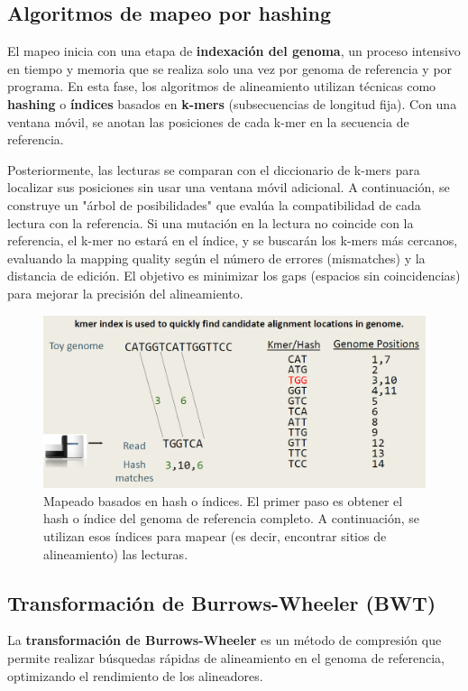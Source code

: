 \begin{itemize}
\subsection{Algoritmos de mapeo por hashing}
El mapeo inicia con una etapa de \textbf{indexación del genoma}, un proceso intensivo en tiempo y memoria que se realiza solo una vez por genoma de referencia y por programa. En esta fase, los algoritmos de alineamiento utilizan técnicas como \textbf{hashing} o \textbf{índices} basados en \textbf{k-mers} (subsecuencias de longitud fija). Con una ventana móvil, se anotan las posiciones de cada k-mer en la secuencia de referencia.

Posteriormente, las lecturas se comparan con el diccionario de k-mers para localizar sus posiciones sin usar una ventana móvil adicional. A continuación, se construye un "árbol de posibilidades" que evalúa la compatibilidad de cada lectura con la referencia. Si una mutación en la lectura no coincide con la referencia, el k-mer no estará en el índice, y se buscarán los k-mers más cercanos, evaluando la mapping quality según el número de errores (mismatches) y la distancia de edición. El objetivo es minimizar los gaps (espacios sin coincidencias) para mejorar la precisión del alineamiento.

\begin{figure}[htbp]
\centering
\includegraphics[width = \textwidth]{figs/hash-mapping.png}
\caption{Mapeado basados en hash o índices. El primer paso es obtener el hash o índice del genoma de referencia completo. A continuación, se utilizan esos índices para mapear (es decir, encontrar sitios de alineamiento) las lecturas.}
\end{figure}

\subsection{Transformación de Burrows-Wheeler (BWT)}
La \textbf{transformación de Burrows-Wheeler} es un método de compresión que permite realizar búsquedas rápidas de alineamiento en el genoma de referencia, optimizando el rendimiento de los alineadores.


\end{itemize}
